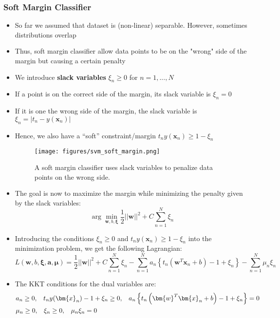 \subsubsection{Soft Margin Classifier}
\begin{itemize}
	\item So far we assumed that dataset is (non-linear) separable. However, sometimes distributions overlap 
	\item Thus, soft margin classifier allow data points to be on the "wrong" side of the margin but causing a certain penalty
	\item We introduce \textbf{slack variables} $\xi_n\geq 0$ for $n=1,...,N$
	\item If a point is on the correct side of the margin, its slack variable is $\xi_n = 0$
	\item If it is one the wrong side of the margin, the slack variable is $\xi_n = |t_n - y(\bm{x}_n)|$
	\item Hence, we also have a ``soft'' constraint/margin $t_n y(\bm{x}_n)\geq 1 - \xi_n$
	\begin{figure}[ht]
		\centering
		\texttt{[image: figures/svm\_soft\_margin.png]}
		\caption{A soft margin classifier uses slack variables to penalize data points on the wrong side.}
		\label{img:svm_soft_margin}
	\end{figure}
	\item The goal is now to maximize the margin while minimizing the penalty given by the slack variables:
	$$\arg\min_{\bm{w},b,\bm{\xi}} \frac{1}{2} ||\bm{w}||^2 + C\sum\limits_{n=1}^{N} \xi_n$$
	\item Introducing the conditions $\xi_n\geq 0$ and $t_n y(\bm{x}_n)\geq 1 - \xi_n$ into the minimization problem, we get the following Lagrangian:
	$$L\left(\bm{w}, b, \bm{\xi}, \bm{a}, \bm{\mu}\right) = \frac{1}{2} ||\bm{w}||^2 +C \sum\limits_{n=1}^{N} \xi_n - \sum\limits_{n=1}^{N} a_n \left\{t_n \left(\bm{w}^T \bm{x}_n + b\right) - 1 + \xi_n \right\} - \sum\limits_{n=1}^{N} \mu_n \xi_n $$
	\item The KKT conditions for the dual variables are:
	\begin{equation*}
		\begin{split}
			& a_n \geq 0,\text{\hspace{3mm}} t_n y(\bm{x}_n) - 1 + \xi_n \geq 0,\text{\hspace{3mm}} a_n \left\{t_n \left(\bm{w}^T \bm{x}_n + b\right) - 1 + \xi_n \right\} = 0\\
			& \mu_n \geq 0,\text{\hspace{3mm}} \xi_n \geq 0,\text{\hspace{3mm}} \mu_n \xi_n = 0\\

\end{split}
\end{equation*}
\end{itemize}
